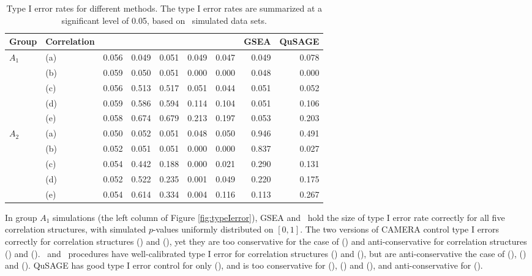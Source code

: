 			\begin{landscape}		
				\begin{table}[th]
					\caption[Type I error rates for different methods]{Type I error rates for 
					different methods. The type I error rates are 
					summarized at a significant level of 0.05, based on \HowmanySimu~simulated data 
					sets.}
					\label{table:apptypeIerror1}
					\centering
					\begin{tabular}{llrrrrrrr}
						\hline
						Group & Correlation & \OurMethod & \genr & \gent & \CMT & \CMR & GSEA & 
						QuSAGE 
						\\
						\hline
						\multirow{5}{*}{$A_1$}  & (a) & 0.056 & 0.049 & 0.051 & 0.049 & 0.047 & 
						0.049 & 
						0.078 
						\\ 
						& (b) & 0.059 & 0.050 & 0.051 & 0.000 & 0.000 & 0.048 & 0.000 \\ 
						& (c) & 0.056 & 0.513 & 0.517 & 0.051 & 0.044 & 0.051 & 0.052 \\ 
						& (d) & 0.059 & 0.586 & 0.594 & 0.114 & 0.104 & 0.051 & 0.106 \\ 
						& (e) & 0.058 & 0.674 & 0.679 & 0.213 & 0.197 & 0.053 & 0.203 \\ \hline
						\multirow{5}{*}{$A_2$} & (a) & 0.050 & 0.052 & 0.051 & 0.048 & 0.050 & 
						0.946 & 
						0.491 \\ 
						& (b) & 0.052 & 0.051 & 0.051 & 0.000 & 0.000 & 0.837 & 0.027 \\ 
						& (c) & 0.054 & 0.442 & 0.188 & 0.000 & 0.021 & 0.290 & 0.131 \\ 
						& (d) & 0.052 & 0.522 & 0.235 & 0.001 & 0.049 & 0.220 & 0.175 \\ 
						& (e) & 0.054 & 0.614 & 0.334 & 0.004 & 0.116 & 0.113 & 0.267 \\ 
						\hline
					\end{tabular}
				\end{table}
				
			\end{landscape}	
			
	
		
	In group $A_1$ simulations (the left column of Figure \ref{fig:typeIerror}),  GSEA and
	\OurMethod~hold the size of type I error rate correctly for all five correlation structures, 
	with simulated $p$-values uniformly distributed on $[0, 1]$. The two versions of CAMERA control 
	type I errors correctly for correlation structures (\aaCase) and (\aCase), yet they are too 
	conservative for the case of (\cCase) and anti-conservative for correlation structures (\eCase) 
	and (\fCase). \gent~and \genr~procedures have well-calibrated type I error for correlation 
	structures (\aaCase) and (\cCase), but are anti-conservative the case of (\aCase), (\eCase) and 
	(\fCase). QuSAGE has good type I error control for only (\aCase), and is too conservative for 
	(\aaCase), (\eCase) and	(\fCase), and anti-conservative for (\cCase).
	
